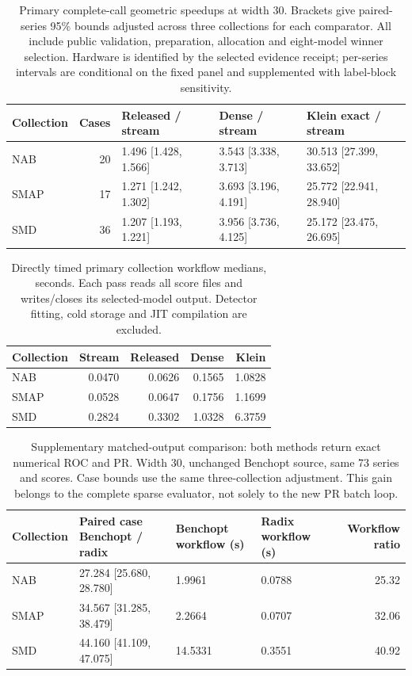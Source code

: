 \begin{table}[t]
\centering\small
\begin{tabular}{lrlll}\toprule
Collection & Cases & Released / stream & Dense / stream & Klein exact / stream\\\midrule
NAB & 20 & 1.496 [1.428, 1.566] & 3.543 [3.338, 3.713] & 30.513 [27.399, 33.652]\\
SMAP & 17 & 1.271 [1.242, 1.302] & 3.693 [3.196, 4.191] & 25.772 [22.941, 28.940]\\
SMD & 36 & 1.207 [1.193, 1.221] & 3.956 [3.736, 4.125] & 25.172 [23.475, 26.695]\\
\bottomrule\end{tabular}
\caption{Primary complete-call geometric speedups at width 30. Brackets give
paired-series 95\% bounds adjusted across three collections for each comparator.
All include public validation, preparation, allocation and eight-model winner
selection. Hardware is identified by the selected evidence receipt; per-series intervals are
conditional on the fixed panel and supplemented with label-block sensitivity.}
\label{tab:primary-new}\end{table}
\begin{table}[t]\centering\small
\begin{tabular}{lrrrr}\toprule
Collection & Stream & Released & Dense & Klein\\\midrule
NAB & 0.0470 & 0.0626 & 0.1565 & 1.0828\\
SMAP & 0.0528 & 0.0647 & 0.1756 & 1.1699\\
SMD & 0.2824 & 0.3302 & 1.0328 & 6.3759\\
\bottomrule\end{tabular}
\caption{Directly timed primary collection workflow medians, seconds. Each pass
reads all score files and writes/closes its selected-model output. Detector
fitting, cold storage and JIT compilation are excluded.}
\label{tab:workflow-new}\end{table}
\begin{table}[t]\centering\small
\begin{tabular}{llllr}\toprule
Collection & Paired case Benchopt / radix & Benchopt workflow (s) & Radix workflow (s) & Workflow ratio\\\midrule
NAB & 27.284 [25.680, 28.780] & 1.9961 & 0.0788 & 25.32\\
SMAP & 34.567 [31.285, 38.479] & 2.2664 & 0.0707 & 32.06\\
SMD & 44.160 [41.109, 47.075] & 14.5331 & 0.3551 & 40.92\\
\bottomrule\end{tabular}
\caption{Supplementary matched-output comparison: both methods return exact
numerical ROC and PR. Width 30, unchanged Benchopt source, same 73 series and
scores. Case bounds use the same three-collection adjustment. This gain belongs
to the complete sparse evaluator, not solely to the new PR batch loop.}
\label{tab:supp-new}\end{table}

